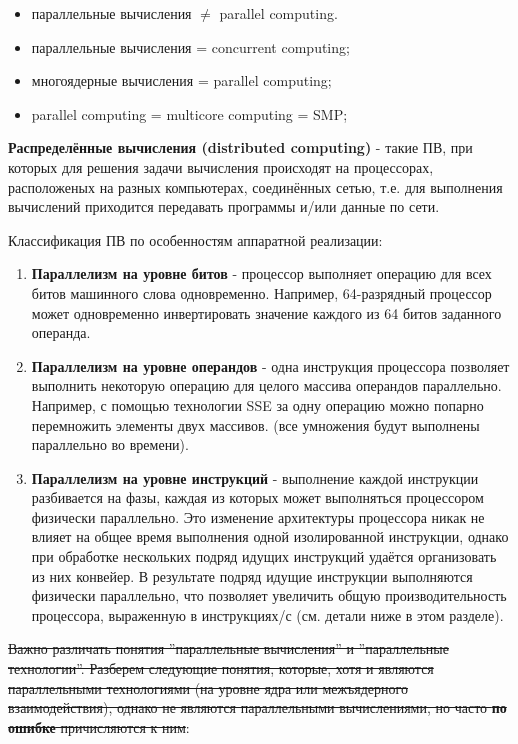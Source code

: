 {		\begin{itemize}
			\item параллельные вычисления $\neq$ parallel computing.			
			\item параллельные вычисления = concurrent computing;
			\item многоядерные вычисления = parallel computing;
			\item parallel computing = multicore computing = SMP;
		\end{itemize}
	\par\textbf{Распределённые вычисления (distributed computing)} - такие ПВ, при которых для решения задачи вычисления происходят на процессорах, расположеных на разных компьютерах, соединённых сетью, т.е. для выполнения вычислений приходится передавать программы и/или данные по сети.
	\par Классификация ПВ по особенностям аппаратной реализации:
		\begin{enumerate}
			\item\textbf{Параллелизм на уровне битов} - процессор выполняет операцию для всех битов машинного слова одновременно. Например, 64-разрядный процессор может одновременно инвертировать значение каждого из 64 битов заданного операнда.
			\item\textbf{Параллелизм на уровне операндов} - одна инструкция процессора позволяет выполнить некоторую операцию для целого массива операндов параллельно. Например, с помощью технологии SSE за одну операцию можно попарно перемножить элементы двух массивов. (все умножения будут выполнены параллельно во времени). 
			\item\textbf{Параллелизм на уровне инструкций} - выполнение каждой инструкции разбивается на фазы, каждая из которых может выполняться процессором физически параллельно. Это изменение архитектуры процессора никак не влияет на общее время выполнения одной изолированной инструкции, однако при обработке нескольких подряд идущих инструкций удаётся организовать из них конвейер. В результате подряд идущие инструкции выполняются физически параллельно, что позволяет увеличить общую производительность процессора, выраженную в инструкциях/с (см. детали ниже в этом разделе).
		\end{enumerate}
	\par\sout{Важно различать понятия ''параллельные вычисления'' и ''параллельные технологии''. Разберем следующие понятия, которые, хотя и являются параллельными технологиями (на уровне ядра или межъядерного взаимодействия), однако не являются параллельными вычислениями, но часто \textbf{по ошибке} причисляются к ним}:
}
